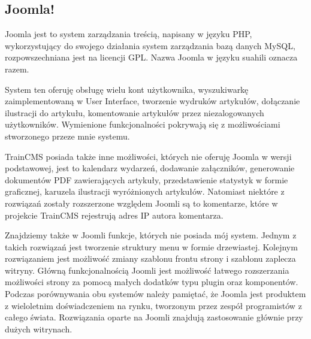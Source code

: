 \documentclass[openright]{xmgr}
\begin{document}
\subsection{Joomla!}

Joomla jest to system zarządzania treścią, napisany w języku PHP, wykorzystujący do swojego działania system zarządzania bazą danych MySQL, rozpowszechniana jest na licencji GPL. Nazwa Joomla w języku suahili oznacza razem.

System ten oferuję obsługę wielu kont użytkownika, wyszukiwarkę zaimplementowaną w User Interface, tworzenie wydruków artykułów, dołączanie ilustracji do artykułu, komentowanie artykułów przez niezalogowanych użytkowników. Wymienione funkcjonalności pokrywają się z możliwościami stworzonego przeze mnie systemu.

\newpage

TrainCMS posiada także inne możliwości, których nie oferuję Joomla w wersji podstawowej, jest to kalendarz wydarzeń, dodawanie załączników, generowanie dokumentów PDF zawierających artykuły, przedstawienie statystyk w formie graficznej, karuzela ilustracji wyróżnionych artykułów. Natomiast niektóre z rozwiązań zostały rozszerzone względem Joomli są to komentarze, które w projekcie TrainCMS rejestrują adres IP autora komentarza.

Znajdziemy także w Joomli funkcje, których nie posiada mój system. Jednym z takich rozwiązań jest tworzenie struktury menu w formie drzewiastej. Kolejnym rozwiązaniem jest możliwość zmiany szablonu frontu strony i szablonu zaplecza witryny. Główną funkcjonalnością Joomli jest możliwość łatwego rozszerzania możliwości strony za pomocą małych dodatków typu plugin oraz komponentów. Podczas porównywania obu systemów należy pamiętać, że Joomla jest produktem z wieloletnim doświadczeniem na rynku, tworzonym przez zespół programistów z całego świata. Rozwiązania oparte na Joomli znajdują zastosowanie głównie przy dużych witrynach.

\newpage
\end{document}
